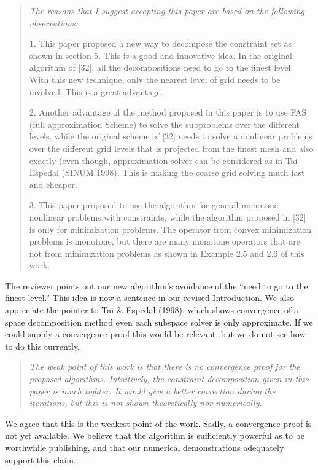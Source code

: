 \documentclass[letterpaper,final,12pt,reqno]{amsart}
\newenvironment{review}%
{\bigskip \par \begin{quote} \selectfont \sl}%
{\end{quote}}
\newcommand\short[1]{\medskip\noindent #1}   %
\newenvironment{response}%
{\medskip\noindent}%
{}
\begin{document}
\begin{review}
The reasons that I suggest accepting this paper are based on the following observations:

1. This paper proposed a new way to decompose the constraint set as shown in section 5. This is a good and innovative idea. In the original algorithm of [32], all the decompositions need to go to the finest level. With this new technique, only the nearest level of grid needs to be involved. This is a great advantage.

2. Another advantage of the method proposed in this paper is to use FAS (full approximation Scheme) to solve the subproblems over the different levels, while the original scheme of [32] needs to solve a nonlinear problems over the different grid levels that is projected from the finest mesh and also exactly (even though, approximation solver can be considered as in Tai-Espedal (SINUM 1998). This is making the coarse grid solving much fast and cheaper.

3. This paper proposed to use the algorithm for general monotone nonlinear problems with constraints, while the algorithm proposed in [32] is only for minimization problems. The operator from convex minimization problems is monotone, but there are many monotone operators that are not from minimization problems as shown in Example 2.5 and 2.6 of this work.
\end{review}

\short{The reviewer points out our new algorithm's avoidance of the ``need to go to the finest level.''  This idea is now a sentence in our revised Introduction.  We also appreciate the pointer to Tai \& Espedal (1998), which shows convergence of a space decomposition method even each subspace solver is only approximate.  If we could supply a convergence proof this would be relevant, but we do not see how to do this currently.}

\begin{review}
The weak point of this work is that there is no convergence proof for the proposed algorithms. Intuitively, the constraint decomposition given in this paper is much tighter. It would give a better correction during the iterations, but this is not shown theoretically nor numerically.
\end{review}

\begin{response}
We agree that this is the weakest point of the work.  Sadly, a convergence proof is not yet available.  We believe that the algorithm is sufficiently powerful as to be worthwhile publishing, and that our numerical demonstrations adequately support this claim.
\end{response}
\end{document}
